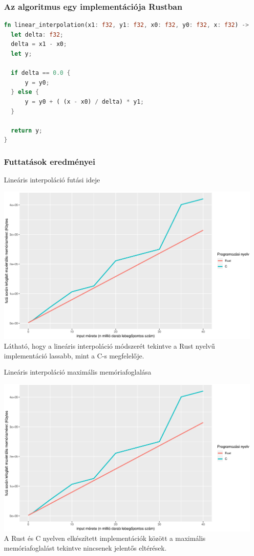 \subsubsection{Az algoritmus egy implementációja Rustban}
\begin{lstlisting}[language=Rust]
fn linear_interpolation(x1: f32, y1: f32, x0: f32, y0: f32, x: f32) -> f32 {
  let delta: f32;
  delta = x1 - x0;
  let y;

  if delta == 0.0 {
      y = y0;
  } else {
      y = y0 + ( (x - x0) / delta) * y1;
  }

  return y;
}
\end{lstlisting}
\subsubsection{Futtatások eredményei}
Lineáris interpoláció futási ideje

\includegraphics[width=15.5cm]{kepek/linear_interpolation_memory.eps}
Látható, hogy a lineáris interpoláció módszerét tekintve a Rust nyelvű implementáció lassabb, mint a C-s megfelelője.

Lineáris interpoláció maximális memóriafoglalása

\includegraphics[width=15.5cm]{kepek/linear_interpolation_memory.eps}
A Rust és C nyelven elkészített implementációk között a maximális memóriafoglalást tekintve nincsenek jelentős eltérések.
